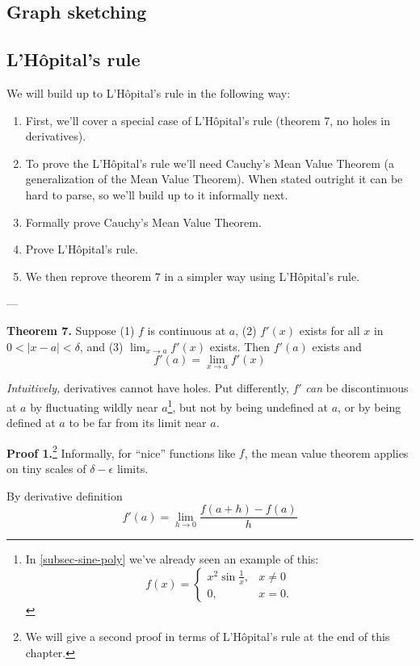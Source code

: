 \subsection{Graph sketching}

\subsection{L'H\^opital's rule}
We will build up to L'H\^opital's rule in the following way:

\begin{enumerate}
\item First, we'll cover a special case of L'H\^opital's rule (theorem
  7, no holes in derivatives).
\item To prove the L'H\^opital's rule we'll need Cauchy's Mean Value
  Theorem (a generalization of the Mean Value Theorem). When stated
  outright it can be hard to parse, so we'll build up to it informally
  next.
\item Formally prove Cauchy's Mean Value Theorem.
\item Prove L'H\^opital's rule.
\item We then reprove theorem 7 in a simpler way using L'H\^opital's
  rule.
\end{enumerate}

---\vs

\textbf{Theorem 7.} Suppose (1) $f$ is continuous at $a$, (2) $f'(x)$
exists for all $x$ in $0<|x-a|<\delta$, and (3) $\lim_{x\to a}f'(x)$ exists.
Then $f'(a)$ exists and
\[f'(a)=\lim_{x\to a}f'(x)\]

\textit{Intuitively,} derivatives cannot have holes. Put differently,
$f'$ \textit{can} be discontinuous at $a$ by fluctuating wildly near
$a$\footnote{In \ref{subsec-sine-poly} we've already seen an example
  of this:
  \[f(x)=\begin{cases}
    x^2\sin \frac{1}{x},&x\neq0\\
    0,&x=0.
  \end{cases}\]}, but
not by being undefined at $a$, or by being defined at $a$ to be far from its limit
near $a$.

\vs

\textbf{Proof 1.}\footnote{We will give a second proof in terms of
  L'H\^opital's rule at the end of this chapter.} Informally, for
``nice'' functions like $f$, the mean value theorem applies on tiny
scales of $\delta-\epsilon$ limits.

\vs

By derivative definition
\[f'(a)=\lim_{h\to 0}\frac{f(a+h)-f(a)}{h}\]

